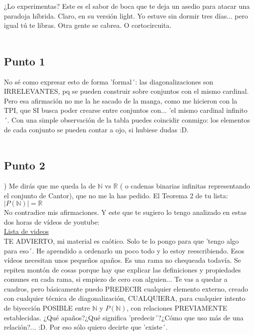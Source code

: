 	\noindent
	¿Lo experimentas? Este es el sabor de boca que te deja un asedio para atacar una paradoja híbrida. Claro, en su versión light. Yo estuve sin dormir tres días... pero igual tú te libras. Otra gente se cabrea. O cortocircuita.\\\\
	
	\subsection{Punto 1}
	
	\noindent
	No sé como expresar esto de forma 'formal´: las diagonalizaciones son IRRELEVANTES, pq se pueden construir sobre conjuntos con el mismo cardinal. Pero esa afirmación no me la he sacado de la manga, como me hicieron con la TPI, que SI busca poder crearse entre conjuntos con... 'el mismo cardinal infinito´. Con una simple observación de la tabla puedes coincidir conmigo: los elementos de cada conjunto se pueden contar a ojo, si hubiese dudas :D.\\\\
	
	\subsection{Punto 2}
	
	) Me dirás que me queda la de $\mathbb{N}$ vs $\mathbb{R}$ ( o cadenas binarias infinitas representando el conjunto de Cantor), que no me la has pedido. El Teorema 2 de tu lista:\\
	$|P(\mathbb{N})| = \mathbb{R}$\\
	No contradice mis afirmaciones. Y este que te sugiero lo tengo analizado en estas dos horas de vídeos de youtube:\\
	\href{https://www.youtube.com/watch?v=reRUUKGFXf0&list=PLcEv5UNDUdw68yFXf2kYGDZVyIGpCfGdy}{Lista de videos}\\
	TE ADVIERTO, mi material es caótico. Solo te lo pongo para que 'tengo algo para eso´. He aprendido a ordenarlo un poco todo y lo estoy reescribiendo. Esos vídeos necesitan unos pequeños apaños. Es una rama no chequeada todavía. Se repiten montón de cosas porque hay que explicar las definiciones y propiedades comunes en cada rama, si empiezo de cero con alguien... Te vas a quedar a cuadros, pero básicamente puedo PREDECIR cualquier elemento externo, creado con cualquier técnica de diagonalización, CUALQUIERA, para cualquier intento de biyección POSIBLE entre $\mathbb{N}$ y $P(\mathbb{N})$, con relaciones PREVIAMENTE establecidas. ¿Qué apaños?¿Qué significa 'predecir´?¿Cómo que uso más de una relación?... :D. Por eso sólo quiero decirte que 'existe´.
	

